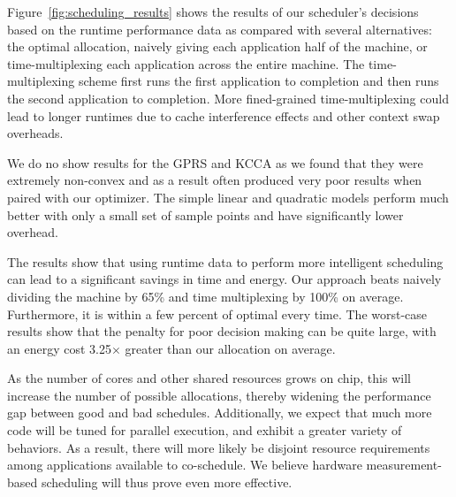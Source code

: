 Figure~\ref{fig:scheduling_results} shows the results of our
scheduler's decisions based on the runtime performance data as
compared with several alternatives: the optimal allocation, naively
giving each application half of the machine, or time-multiplexing each
application across the entire machine.  The time-multiplexing scheme
first runs the first application to completion and then runs the
second application to completion.  More fined-grained
time-multiplexing could lead to longer runtimes due to cache
interference effects and other context swap overheads.

We do no show results for the GPRS and KCCA as we found that they were extremely non-convex and as a result often produced very poor results when paired with our optimizer. The simple linear and quadratic models perform much better with only a small set of sample points and have significantly lower overhead.

The results
show that using runtime data to perform more intelligent scheduling
can lead to a significant savings in time and energy.  Our approach
beats naively dividing the machine by 65\% and time multiplexing by
100\% on average. Furthermore, it is within a few percent of optimal
every time.  The worst-case results show that the penalty for poor
decision making can be quite large, with an energy cost 3.25$\times$
greater than our allocation on average.

As the number of cores and other shared resources grows on chip, this
will increase the number of possible allocations, thereby widening the
performance gap between good and bad schedules.  Additionally, we
expect that much more code will be tuned for parallel execution, and
exhibit a greater variety of behaviors.  As a result, there will more
likely be disjoint resource requirements among applications available
to co-schedule.  We believe hardware measurement-based scheduling will
thus prove even more effective.




